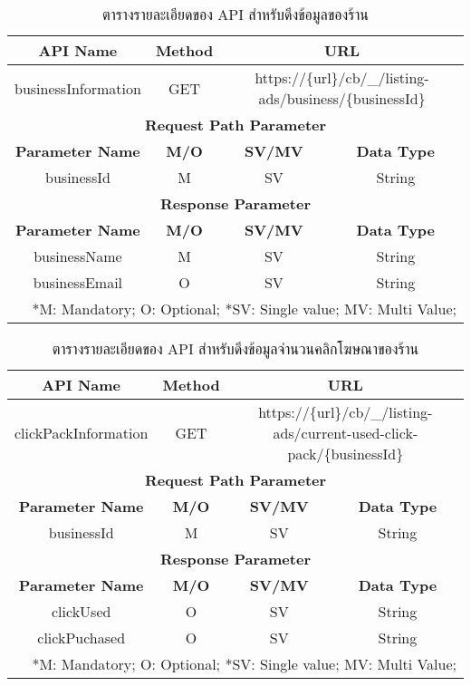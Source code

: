 \begin{enumerate}
\begin{itemize}
		\begin{table}[!h]
			\centering
			\begin{tabular}{|c|c|c|c|}
				\hline
				\textbf{API Name} & \textbf{Method} & \multicolumn{2}{c|}{\textbf{URL}} \\ \hline
				businessInformation & GET & \multicolumn{2}{c|}{https://\{url\}/cb/\_/listing-ads/business/\{businessId\}} \\ \hline
				\multicolumn{4}{|c|}{\textbf{Request Path Parameter}} \\ \hline
				\textbf{Parameter Name} & \textbf{M/O} & \textbf{SV/MV} & \textbf{Data Type} \\ \hline
				businessId & M & SV & String \\ \hline
				\multicolumn{4}{|c|}{\textbf{Response Parameter}} \\ \hline
				\textbf{Parameter Name} & \textbf{M/O} & \textbf{SV/MV} & \textbf{Data Type} \\ \hline
				businessName & M & SV & String \\ \hline
				businessEmail & O & SV & String \\ \hline
				\multicolumn{4}{|r|}{*M: Mandatory; O: Optional; *SV: Single value; MV: Multi Value;} \\ \hline
			\end{tabular}
			\caption{ตารางรายละเอียดของ API สำหรับดึงข้อมูลของร้าน}
			\label{Table:api-detail-1}
		\end{table}
		
		\begin{table}[!h]
			\centering
			\begin{tabular}{|c|c|c|c|}
				\hline
				\textbf{API Name} & \textbf{Method} & \multicolumn{2}{c|}{\textbf{URL}} \\ \hline
				clickPackInformation & GET & \multicolumn{2}{c|}{https://\{url\}/cb/\_/listing-ads/current-used-click-pack/\{businessId\}} \\ \hline
				\multicolumn{4}{|c|}{\textbf{Request Path Parameter}} \\ \hline
				\textbf{Parameter Name} & \textbf{M/O} & \textbf{SV/MV} & \textbf{Data Type} \\ \hline
				businessId & M & SV & String \\ \hline
				\multicolumn{4}{|c|}{\textbf{Response Parameter}} \\ \hline
				\textbf{Parameter Name} & \textbf{M/O} & \textbf{SV/MV} & \textbf{Data Type} \\ \hline
				clickUsed & O & SV & String \\ \hline
				clickPuchased & O & SV & String \\ \hline
				\multicolumn{4}{|r|}{*M: Mandatory; O: Optional; *SV: Single value; MV: Multi Value;} \\ \hline
			\end{tabular}
			\caption{ตารางรายละเอียดของ API สำหรับดึงข้อมูลจำนวนคลิกโฆษณาของร้าน}
			\label{Table:api-detail-2}
		\end{table}
	\end{itemize}
		


\end{enumerate}
